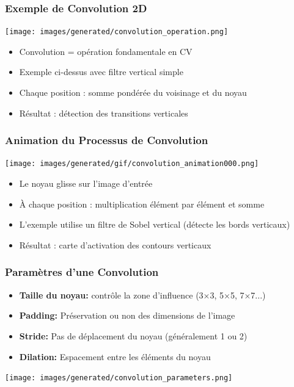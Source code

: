 \documentclass{beamer}
\begin{document}
\begin{frame}
    \frametitle{Exemple de Convolution 2D}
    \begin{center}
        \texttt{[image: images/generated/convolution\_operation.png]}
    \end{center}
    \begin{itemize}
        \item Convolution = opération fondamentale en CV
        \item Exemple ci-dessus avec filtre vertical simple
        \item Chaque position : somme pondérée du voisinage et du noyau
        \item Résultat : détection des transitions verticales
    \end{itemize}
\end{frame}

\begin{frame}
    \frametitle{Animation du Processus de Convolution}
    \begin{center}
        \texttt{[image: images/generated/gif/convolution\_animation000.png]}
    \end{center}
    \begin{itemize}
        \item Le noyau glisse sur l'image d'entrée
        \item À chaque position : multiplication élément par élément et somme
        \item L'exemple utilise un filtre de Sobel vertical (détecte les bords verticaux)
        \item Résultat : carte d'activation des contours verticaux
    \end{itemize}
\end{frame}

\begin{frame}
    \frametitle{Paramètres d'une Convolution}
    \begin{itemize}
        \item \textbf{Taille du noyau:} contrôle la zone d'influence (3×3, 5×5, 7×7...)
        \item \textbf{Padding:} Préservation ou non des dimensions de l'image
        \item \textbf{Stride:} Pas de déplacement du noyau (généralement 1 ou 2)
        \item \textbf{Dilation:} Espacement entre les éléments du noyau
    \end{itemize}
    \begin{center}
        \texttt{[image: images/generated/convolution\_parameters.png]}
    \end{center}
\end{frame}
\end{document}
